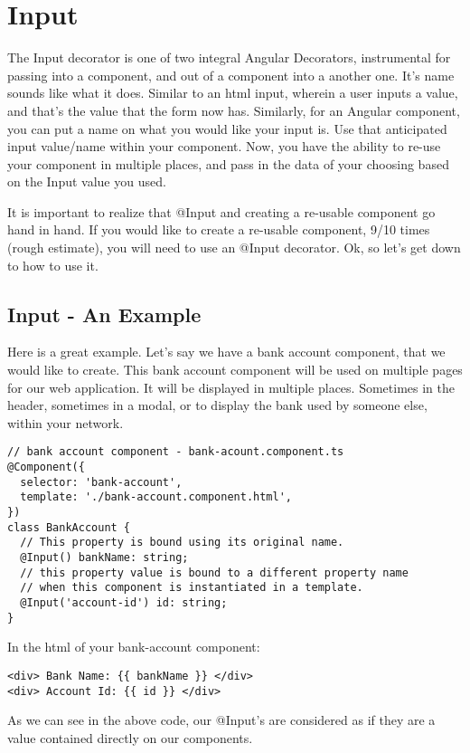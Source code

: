 \section{ Input }

The Input decorator is one of two integral Angular Decorators, instrumental
for passing into a component, and out of a component into a another one. It's
name sounds like what it does. Similar to an html input, wherein a user inputs
a value, and that's the value that the form now has. Similarly, for an Angular
component, you can put a name on what you would like your input is. Use that
anticipated input value/name within your component. Now, you have the ability to
re-use your component in multiple places, and pass in the data of your choosing
based on the Input value you used.

It is important to realize that @Input and creating a re-usable component go
hand in hand. If you would like to create a re-usable component, 9/10 times
(rough estimate), you will need to use an @Input decorator. Ok, so let's get
down to how to use it.

\subsection{ Input - An Example }

Here is a great example. Let's say we have a bank account component, that we
would like to create. This bank account component will be used on multiple
pages for our web application. It will be displayed in multiple places.
Sometimes in the header, sometimes in a modal, or to display the bank used by
someone else, within your network.

\begin{lstlisting}
// bank account component - bank-acount.component.ts
@Component({
  selector: 'bank-account',
  template: './bank-account.component.html',
})
class BankAccount {
  // This property is bound using its original name.
  @Input() bankName: string;
  // this property value is bound to a different property name
  // when this component is instantiated in a template.
  @Input('account-id') id: string;
}
\end{lstlisting}

In the html of your bank-account component:
\begin{lstlisting}
<div> Bank Name: {{ bankName }} </div>
<div> Account Id: {{ id }} </div>
\end{lstlisting}

As we can see in the above code, our @Input's are considered as if they are
a value contained directly on our components.

